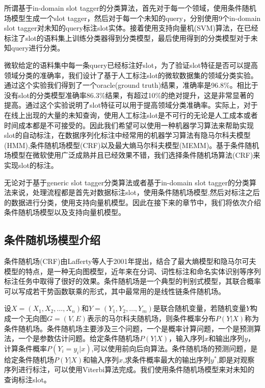 \documentclass[master]{njuthesis}
\begin{document}
    所谓基于in-domain slot tagger的分类算法，首先对于每一个领域，使用条件随机场模型生成一个slot tagger，然后对于每一个未知的query，分别使用9个in-domain slot tagger对未知的query标注slot实体。接着使用支持向量机(SVM)算法，在已经标注了slot的语料集上训练分类器得到分类模型，最后使用得到的分类模型对于未知query进行分类。
    
    微软给定的语料集中每一条query已经标注好slot，为了验证slot特征是否可以提高领域分类的准确率，我们设计了基于人工标注slot的微软数据集的领域分类实验。通过这个实验我们得到了一个oracle(ground truth)结果，准确率是96.8\%。相比于没有slot的分类模型准确率86.3\%结果，有超过10\%的绝对提升，这是非常显著的提高。通过这个实验说明了slot特征可以用于提高领域分类准确率。实际上，对于在线上出现的大量的未知查询，使用人工标注slot是不可行的无论是人工成本或者时间成本都是不可接受的。因此我们希望可以使用一种机器学习算法来帮助实现slot的自动标注，在数据序列化标注中经常用的机器学习算法有隐马尔科夫模型(HMM),条件随机场模型(CRF)以及最大熵马尔科夫模型(MEMM)。基于条件随机场模型在微软使用广泛成熟并且已经效果不错，我们选择条件随机场算法(CRF)来实现slot的标注。
    
    无论对于基于generic slot tagger分类算法或者基于in-domain slot tagger的分类算法来说，处理流程都是首先对数据标注slot，使用条件随机场模型,然后对标注之后的数据进行分类，使用支持向量机模型。因此在接下来的章节中，我们将依次介绍条件随机场模型以及支持向量机模型。

\subsection{条件随机场模型介绍}

    条件随机场(CRF)由Lafferty等人于2001年提出，结合了最大熵模型和隐马尔可夫模型的特点，是一种无向图模型\cite{CRF}，近年来在分词、词性标注和命名实体识别等序列标注任务中取得了很好的效果。条件随机场是一个典型的判别式模型，其联合概率可以写成若干势函数联乘的形式，其中最常用的是线性链条件随机场。
    
    设$X = \left(X_1,X_2,\dots,X_n\right)$和$Y=\left(Y_1,Y_2,\dots,Y_m\right)$是联合随机变量，若随机变量$Y$构成一个无向图$G=\left(V,E\right)$表示的马尔科夫随机场，则条件概率分布$P\left(Y|X\right)$称为条件随机场。条件随机场主要涉及三个问题，一个是概率计算问题，一个是预测算法，一个是参数估计问题。给定条件随机场$P\left(Y|X\right)$，输入序列$x$和输出序列$y$，计算条件概率$P\left(Y_i=y_i|x\right)$,可以使用前向后向算法。条件随机场的预测问题，是给定条件随机场$P\left(Y|X\right)$和输入序列$x$,求条件概率最大的输出序列$y^\ast$,即是对观察序列进行标注，可以使用Viterbi算法完成。我们使用条件随机场模型来对未知的查询标注slot。
\end{document}
